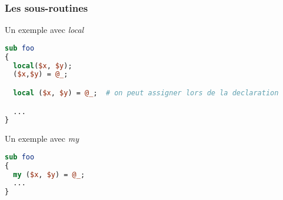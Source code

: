 \begin{frame}[fragile]
  \frametitle{Les sous-routines}

  \begin{exampleblock}{Un exemple avec \textit{local}}
    \begin{lstlisting}[language=perl]
sub foo
{
  local($x, $y);
  ($x,$y) = @_;

  local ($x, $y) = @_;  # on peut assigner lors de la declaration

  ...
}
    \end{lstlisting}
  \end{exampleblock}

  \begin{alertblock}{Un exemple avec \textit{my}}
    \begin{lstlisting}[language=perl]
sub foo
{
  my ($x, $y) = @_;
  ...
}
    \end{lstlisting}
  \end{alertblock}

\end{frame}
